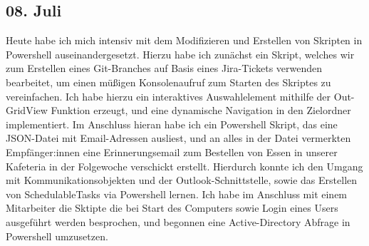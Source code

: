 \subsection{08. Juli}
Heute habe ich mich intensiv mit dem Modifizieren und Erstellen von Skripten in Powershell auseinandergesetzt. Hierzu habe ich zunächst ein Skript, welches wir zum Erstellen eines Git-Branches auf Basis eines Jira-Tickets verwenden bearbeitet, um einen müßigen Konsolenaufruf zum Starten des Skriptes zu vereinfachen. Ich habe hierzu ein interaktives Auswahlelement mithilfe der Out-GridView Funktion erzeugt, und eine dynamische Navigation in den Zielordner implementiert.
Im Anschluss hieran habe ich ein Powershell Skript, das eine JSON-Datei mit Email-Adressen ausliest, und an alles in der Datei vermerkten Empfänger:innen eine Erinnerungsemail zum Bestellen von Essen in unserer Kafeteria in der Folgewoche verschickt erstellt. Hierdurch konnte ich den Umgang mit Kommunikationsobjekten und der Outlook-Schnittstelle, sowie das Erstellen von SchedulableTasks via Powershell lernen. Ich habe im Anschluss mit einem Mitarbeiter die Sktipte die bei Start des Computers sowie Login eines Users ausgeführt werden besprochen, und begonnen eine Active-Directory Abfrage in Powershell umzusetzen.